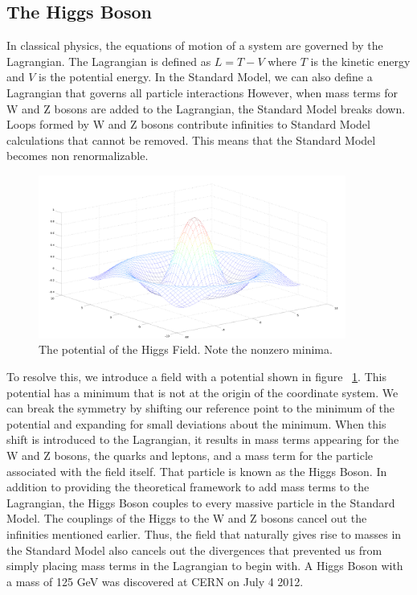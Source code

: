 \documentclass[oneside, letterpaper, oldfontcommands]{memoir}
\begin{document}
\subsection{The Higgs Boson}\label{higgstheory}
\qquad In classical physics, the equations of motion of a system are governed by the Lagrangian. The Lagrangian is defined as $L = T - V$ where $T$ is the kinetic energy and $V$ is the potential energy. In the Standard Model, we can also define a Lagrangian that governs all particle interactions\cite{Halzen:1984mc} However, when mass terms for W and Z bosons are added to the Lagrangian, the Standard Model breaks down. Loops formed by W and Z bosons contribute infinities to Standard Model calculations that cannot be removed. This means that the Standard Model becomes non renormalizable. 

\begin{figure}[here]
\includegraphics[width=0.9\textwidth]{HiggsPotential.png}
\caption{The potential of the Higgs Field. Note the nonzero minima.}
\label{fig:HiggsPotential}
\end{figure}

\qquad To resolve this, we introduce a field with a potential shown in figure ~\ref{fig:HiggsPotential}. This potential has a minimum that is not at the origin of the coordinate system. We can break the symmetry by shifting our reference point to the minimum of the potential and expanding for small deviations about the minimum. When this shift is introduced to the Lagrangian, it results in mass terms appearing for the W and Z bosons, the quarks and leptons, and a mass term for the particle associated with the field itself. That particle is known as the Higgs Boson. In addition to providing the theoretical framework to add mass terms to the Lagrangian, the Higgs Boson couples to every massive particle in the Standard Model. The couplings of the Higgs to the W and Z bosons cancel out the infinities mentioned earlier.\cite{Halzen:1984mc} Thus, the field that naturally gives rise to masses in the Standard Model also cancels out the divergences that prevented us from simply placing mass terms in the Lagrangian to begin with. A Higgs Boson with a mass of 125 GeV was discovered at CERN on July 4 2012. \cite{Agashe:2014kda}
 
\end{document}
